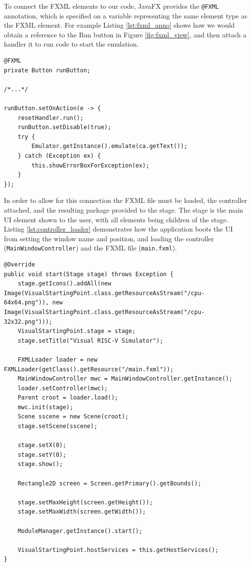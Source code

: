 To connect the FXML elements to our code, JavaFX \cite{sunmicrosystems_2022_javafx} provides the \texttt{@FXML} annotation, which is specified on a variable representing the same element type as the FXML element. For example Listing \ref{lst:fxml_anno} shows how we would obtain a reference to the Run button in Figure \ref{fig:fxml_view}, and then attach a handler it to run code to start the emulation.

\begin{lstlisting}[caption=FXML annotation for a button, label=lst:fxml_anno]
@FXML
private Button runButton;

/*...*/

runButton.setOnAction(e -> {
    resetHandler.run();
    runButton.setDisable(true);
    try {
        Emulator.getInstance().emulate(ca.getText());
    } catch (Exception ex) {
        this.showErrorBoxForException(ex);
    }
});
\end{lstlisting}

In order to allow for this connection the FXML file must be loaded, the controller attached, and the resulting package provided to the stage. The stage is the main \ac{UI} element shown to the user, with all elements being children of the stage. Listing \ref{lst:controller_loader} demonstrates how the application boots the \ac{UI} from setting the window name and position, and loading the controller (\texttt{MainWindowController}) and the FXML file (\texttt{main.fxml}).

\begin{lstlisting}[caption=\ac{UI} starting point, label=lst:controller_loader]
@Override
public void start(Stage stage) throws Exception {
    stage.getIcons().addAll(new Image(VisualStartingPoint.class.getResourceAsStream("/cpu-64x64.png")), new Image(VisualStartingPoint.class.getResourceAsStream("/cpu-32x32.png")));
    VisualStartingPoint.stage = stage;
    stage.setTitle("Visual RISC-V Simulator");

    FXMLLoader loader = new FXMLLoader(getClass().getResource("/main.fxml"));
    MainWindowController mwc = MainWindowController.getInstance();
    loader.setController(mwc);
    Parent croot = loader.load();
    mwc.init(stage);
    Scene sscene = new Scene(croot);
    stage.setScene(sscene);

    stage.setX(0);
    stage.setY(0);
    stage.show();

    Rectangle2D screen = Screen.getPrimary().getBounds();

    stage.setMaxHeight(screen.getHeight());
    stage.setMaxWidth(screen.getWidth());

    ModuleManager.getInstance().start();

    VisualStartingPoint.hostServices = this.getHostServices();
}
\end{lstlisting}

